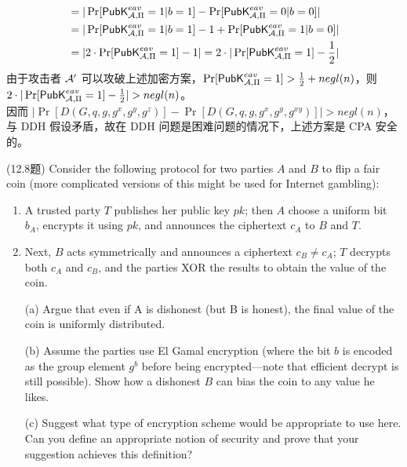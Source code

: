 \begin{questions}
\begin{solution}
\begin{enumerate}
\begin{equation}
\begin{aligned}
                            &=|\Pr[\mathsf{PubK}^{eav}_{\mathcal{A},\Pi}=1|b=1]-\Pr[\mathsf{PubK}^{eav}_{\mathcal{A},\Pi}=0|b=0]|\\
                            &=|\Pr[\mathsf{PubK}^{eav}_{\mathcal{A},\Pi}=1|b=1]-1+\Pr[\mathsf{PubK}^{eav}_{\mathcal{A},\Pi}=1|b=0]|\\
                            &=|2\cdot\Pr[\mathsf{PubK}^{eav}_{\mathcal{A},\Pi}=1]-1|=2\cdot|\Pr[\mathsf{PubK}^{eav}_{\mathcal{A},\Pi}=1]-\frac{1}{2}|
                        \end{aligned}
                    \end{equation}
                由于攻击者 $\mathcal{A}'$ 可以攻破上述加密方案，$\Pr[\mathsf{PubK}^{eav}_{\mathcal{A},\Pi}=1]>\frac{1}{2}+negl(n)$，则 $2\cdot|\Pr[\algo{PubK}^{eav}_{\Adv,\Pi}=1]-\frac{1}{2}|>negl(n)$。\\
                因而 $|\Pr[D(G,q,g,g^x,g^y,g^z)]-\Pr[D(G,q,g,g^x,g^y,g^{xy})]|>negl(n)$，与 DDH 假设矛盾，故在 DDH 问题是困难问题的情况下，上述方案是 CPA 安全的。
            \end{enumerate}
        \end{solution}

    \question (12.8题) Consider the following protocol for two parties $A$ and $B$ to flip a fair coin (more complicated versions of this might be used for Internet gambling):

        \begin{enumerate}
            \item A trusted party $T$ publishes her public key $pk$; then $A$ choose a uniform bit $b_A$, encrypts it using $pk$, and announces the ciphertext $c_A$ to $B$ and $T$.
            \item Next, $B$ acts symmetrically and announces a ciphertext $c_B\neq{c_A}$; $T$ decrypts both $c_A$ and $c_B$, and the parties XOR the results to obtain the value of the coin.
        \end{enumerate}

        \begin{enumerate}
            \item[(a)] Argue that even if A is dishonest (but B is honest), the final value of the coin is uniformly distributed.
            \item[(b)] Assume the parties use El Gamal encryption (where the bit $b$ is encoded as the group element $g^b$ before being encrypted—note that efficient decrypt is still possible). Show how a dishonest $B$ can bias the coin to any value he likes.
            \item[(c)] Suggest what type of encryption scheme would be appropriate to use here. Can you define an appropriate notion of security and prove that your suggestion achieves this definition?
        \end{enumerate}


\end{questions}
